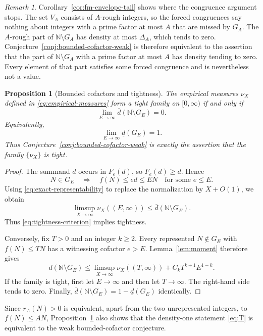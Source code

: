 \documentclass[11pt]{article}
\newtheorem{proposition}[theorem]{Proposition}
\theoremstyle{remark}
\newtheorem{remark}[theorem]{Remark}
\newcommand{\N}{\mathbb N}
\newcommand{\1}{\mathbf 1}
\newcommand{\lowerdens}{\underline d}
\newcommand{\upperdens}{\overline d}
\begin{document}
\begin{remark}\label{rmk:fm-limit}
Corollary~\ref{cor:fm-envelope-tail} shows where the congruence argument
stops.  The set $V_A$ consists of $A$-rough integers, so the forced
congruences say nothing about integers with a prime factor at most $A$
that are missed by $G_A$.  The $A$-rough part of $\N\setminus G_A$ has
density at most $\Delta_A$, which tends to zero.
Conjecture~\ref{conj:bounded-cofactor-weak} is therefore equivalent to the
assertion that the part of $\N\setminus G_A$ with a prime factor at most
$A$ has density tending to zero.  Every element of that part satisfies some
forced congruence and is nevertheless not a value.
\end{remark}

\begin{proposition}[Bounded cofactors and tightness]
\label{prop:tightness-equivalence}
The empirical measures $\nu_X$ defined in \eqref{eq:empirical-measures} form
a tight family on $[0,\infty)$ if and only if
\begin{equation}\label{eq:tightness-criterion}
 \lim_{E\to\infty}\upperdens(\N\setminus G_E)=0.
\end{equation}
Equivalently,
\[
 \lim_{E\to\infty}\lowerdens(G_E)=1.
\]
Thus Conjecture~\ref{conj:bounded-cofactor-weak} is exactly the assertion
that the family $\{\nu_X\}$ is tight.
\end{proposition}

\begin{proof}
The summand $d$ occurs in $F_e(d)$, so $F_e(d)\geq d$.  Hence
\[
 N\in G_E\quad\Longrightarrow\quad f(N)\leq ed\leq EN
 \quad\text{for some }e\leq E.
\]
Using \eqref{eq:exact-representability} to replace the normalization by
$X+O(1)$, we obtain
\[
 \limsup_{X\to\infty}\nu_X((E,\infty))
 \leq\upperdens(\N\setminus G_E).
\]
Thus \eqref{eq:tightness-criterion} implies tightness.

Conversely, fix $T>0$ and an integer $k\geq2$.  Every represented
$N\notin G_E$ with $f(N)\leq TN$ has a witnessing cofactor $e>E$.
Lemma~\ref{lem:moment} therefore gives
\[
 \upperdens(\N\setminus G_E)
 \leq\limsup_{X\to\infty}\nu_X((T,\infty))
      +C_kT^{k+1}E^{1-k}.
\]
If the family is tight, first let $E\to\infty$ and then let $T\to\infty$.
The right-hand side tends to zero.  Finally,
$\upperdens(\N\setminus G_E)=1-\lowerdens(G_E)$ identically.
\end{proof}

Since $r_A(N)>0$ is equivalent, apart from the two unrepresented integers,
to $f(N)\leq AN$, Proposition~\ref{prop:tightness-equivalence} also shows
that the density-one statement \eqref{eq:T} is equivalent to the weak
bounded-cofactor conjecture.
\end{document}
